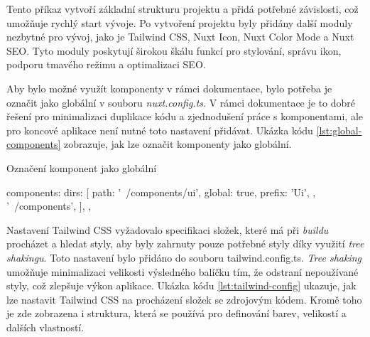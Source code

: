 Tento příkaz vytvoří základní strukturu projektu a přidá potřebné závislosti, což umožňuje rychlý start vývoje. Po vytvoření projektu byly přidány další moduly nezbytné pro vývoj, jako je Tailwind CSS, Nuxt Icon, Nuxt Color Mode a Nuxt SEO. Tyto moduly poskytují širokou škálu funkcí pro stylování, správu ikon, podporu tmavého režimu a optimalizaci SEO.

Aby bylo možné využít komponenty v rámci dokumentace, bylo potřeba je označit jako globální v souboru \emph{nuxt.config.ts}. V rámci dokumentace je to dobré řešení pro minimalizaci duplikace kódu a zjednodušení práce s komponentami, ale pro koncové aplikace není nutné toto nastavení přidávat. Ukázka kódu \ref{lst:global-components} zobrazuje, jak lze označit komponenty jako globální.

\begin{listing}[H]
    \caption{Označení komponent jako globální}
    \label{lst:global-components}
    \begin{code}
components: {
  dirs: [
    {
      path: '~/components/ui',
      global: true,
      prefix: 'Ui',
    },
    '~/components',
  ],
},
\end{code}
\end{listing}

Nastavení Tailwind CSS vyžadovalo specifikaci složek, které má při \emph{buildu} procházet a hledat styly, aby byly zahrnuty pouze potřebné styly díky využití \emph{tree shakingu}. Toto nastavení bylo přidáno do souboru tailwind.config.ts. \emph{Tree shaking} umožňuje minimalizaci velikosti výsledného balíčku tím, že odstraní nepoužívané styly, což zlepšuje výkon aplikace. Ukázka kódu \ref{lst:tailwind-config} ukazuje, jak lze nastavit Tailwind CSS na procházení složek se zdrojovým kódem. Kromě toho je zde zobrazena i struktura, která se používá pro definování barev, velikostí a dalších vlastností.

